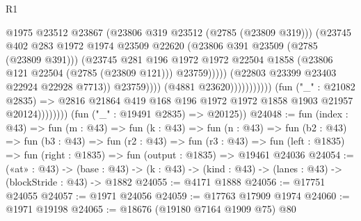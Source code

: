 \begin{lexlean}{R1}
\begin{coremodule}
                                                        @1975
                                                        @23512
                                                        @23867
                                                        (@23806 @319 @23512 (@2785 (@23809 @319)))
                                                        (@23745
                                                          @402
                                                          @283
                                                          @1972
                                                          @1974
                                                          @23509
                                                          @22620
                                                          (@23806 @391 @23509 (@2785 (@23809 @391)))
                                                          (@23745
                                                            @281
                                                            @196
                                                            @1972
                                                            @1972
                                                            @22504
                                                            @1858
                                                            (@23806
                                                              @121
                                                              @22504
                                                              (@2785 (@23809 @121)))
                                                            @23759)))))
                                                  (@22803 @23399 @23403 @22924 @22928 @7713))
                                                @23759))))
                                        (@4881 @23620)))))))))))
                    (fun ("_" : @21082 @2835) =>
                    @2816 @21864 @419 @168 @196 @1972 @1972 @1858 @1903 @21957 @20124))))))))
      (fun ("_" : @19491 @2835) => @20125))
@24048 := fun (index : @43) =>
  fun (m : @43) =>
  fun (k : @43) =>
  fun (n : @43) =>
  fun (b2 : @43) =>
  fun (b3 : @43) =>
  fun (r2 : @43) =>
  fun (r3 : @43) =>
  fun (left : @1835) => fun (right : @1835) => fun (output : @1835) => @19461 @24036
@24054 := («at» : @43) ->
  (base : @43) -> (k : @43) -> (kind : @43) -> (lanes : @43) -> (blockStride : @43) -> @1882
@24055 := @4171 @1888
@24056 := @17751 @24055
@24057 := @1971 @24056
@24059 := @17763 @17909 @1974
@24060 := @1971 @19198
@24065 := @18676 (@19180 @7164 @1909 @75) @80

\end{coremodule}
\end{lexlean}
